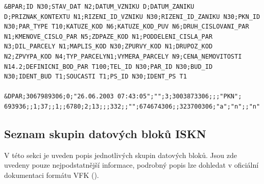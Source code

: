 \documentclass[a4paper,12pt,oneside]{book}
\begin{document}
\begin{lstlisting}
&BPAR;ID N30;STAV_DAT N2;DATUM_VZNIKU D;DATUM_ZANIKU D;PRIZNAK_KONTEXTU N1;RIZENI_ID_VZNIKU N30;RIZENI_ID_ZANIKU N30;PKN_ID N30;PAR_TYPE T10;KATUZE_KOD N6;KATUZE_KOD_PUV N6;DRUH_CISLOVANI_PAR N1;KMENOVE_CISLO_PAR N5;ZDPAZE_KOD N1;PODDELENI_CISLA_PAR N3;DIL_PARCELY N1;MAPLIS_KOD N30;ZPURVY_KOD N1;DRUPOZ_KOD N2;ZPVYPA_KOD N4;TYP_PARCELYN1;VYMERA_PARCELY N9;CENA_NEMOVITOSTI N14.2;DEFINICNI_BOD_PAR T100;TEL_ID N30;PAR_ID N30;BUD_ID N30;IDENT_BUD T1;SOUCASTI T1;PS_ID N30;IDENT_PS T1

&DPAR;3067989306;0;"26.06.2003 07:43:05";"";3;3003873306;;;"PKN"; 693936;;1;37;;1;;6780;2;13;;;332;;"";674674306;;323700306;"a";"n";;"n"
\end{lstlisting}

\subsection*{Seznam skupin datových bloků ISKN}

V této sekci je uveden popis jednotlivých skupin datových bloků. Jsou zde uvedeny pouze nejpodstatnější informace, podrobný popis lze dohledat v oficiální dokumentaci formátu VFK (\cite{vfk_struktura}).
\end{document}
